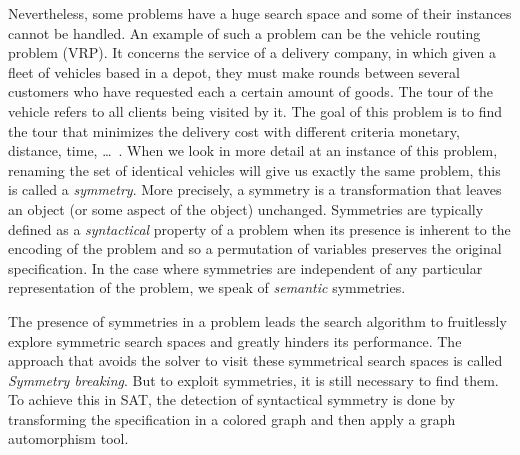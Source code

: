 Nevertheless, some problems have a huge search space and some of their instances cannot be handled.
An example of such a problem can be the vehicle routing problem (VRP).
It concerns the service of a delivery company, in which
given a fleet of vehicles based in a depot, they must make rounds between several customers  who have requested
each a certain amount of goods. The tour of the vehicle refers to all clients being visited by it. 
The goal of this problem is to find the tour that minimizes the delivery cost with different criteria monetary, distance, time, …~\cite{toth2002vehicle}.
When we look in more detail at an instance of this problem, renaming the set of identical vehicles will give us exactly the same problem,
this is called a \textit{symmetry}. More precisely, a symmetry is a transformation that leaves an object (or some aspect of the object) unchanged. Symmetries are typically defined as a \textit{syntactical} property of a problem when its presence is inherent to the encoding of the problem and so a permutation of variables preserves the original specification. In the case where symmetries are independent of any 
particular representation of the problem, we speak of \textit{semantic} symmetries.

The presence of symmetries in a problem leads the search algorithm to fruitlessly explore symmetric
search spaces and greatly hinders its performance.
 The approach that avoids the solver to visit these symmetrical search spaces is called \textit{Symmetry breaking}.
But to exploit symmetries, it is still necessary to find them.
To achieve this in SAT, the detection of syntactical symmetry is done by transforming the specification
in a colored graph and then apply a graph automorphism tool.


%
%
%
%
%
%
%
%
%

